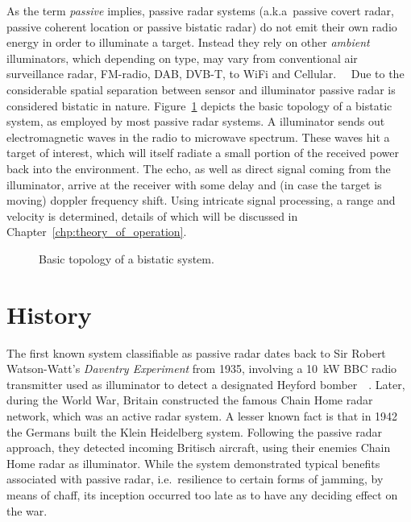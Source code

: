 As the term \emph{passive} implies, passive radar systems (a.k.a\ passive covert radar, passive coherent location or passive bistatic radar) do not emit their own radio energy in order to illuminate a target. Instead they rely on other \emph{ambient} illuminators, which depending on type, may vary from conventional air surveillance radar, FM-radio, DAB, DVB-T, to WiFi and Cellular.~\cite[pp.~48--77]{Malanowski2019}\ \cite{Kuschel2013} Due to the considerable spatial separation between sensor and illuminator passive radar is considered bistatic in nature. Figure~\ref{fig:topology} depicts the basic topology of a bistatic system, as employed by most passive radar systems. A illuminator sends out electromagnetic waves in the radio to microwave spectrum. These waves hit a target of interest, which will itself radiate a small portion of the received power back into the environment. The echo, as well as direct signal coming from the illuminator, arrive at the receiver with some delay and (in case the target is moving) doppler frequency shift. Using intricate signal processing, a range and velocity is determined, details of which will be discussed in Chapter~\ref{chp:theory_of_operation}.

\begin{figure}
    \centering
    \begin{tikzpicture}
        
    \end{tikzpicture}
    \caption{Basic topology of a bistatic system.}\label{fig:topology}
\end{figure}

\section{History}

The first known system classifiable as passive radar dates back to Sir Robert Watson-Watt's \emph{Daventry Experiment} from 1935, involving a \SI{10}{\kilo\watt} BBC radio transmitter used as illuminator to detect a designated Heyford bomber~\cite[pp.~5--6]{Malanowski2019}~\cite{Kuschel2013}. Later, during the  World War, Britain constructed the famous Chain Home radar network, which was an active radar system. A lesser known fact is that in 1942 the Germans built the Klein Heidelberg system. Following the passive radar approach, they detected incoming Britisch aircraft, using their enemies Chain Home radar as illuminator. While the system demonstrated typical benefits associated with passive radar, i.e.\ resilience to certain forms of jamming, by means of chaff, its inception occurred too late as to have any deciding effect on the war.~\cite{Griffiths2010}

